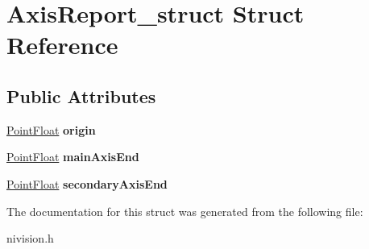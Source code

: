 \hypertarget{structAxisReport__struct}{
\section{AxisReport\_\-struct Struct Reference}
\label{structAxisReport__struct}
}
\subsection*{Public Attributes}
\begin{DoxyCompactItemize}
\item 
\hypertarget{structAxisReport__struct_ae9947337118dc61e3fb3b3bc6200c6c5}{
\hyperlink{structPointFloat__struct}{PointFloat} {\bfseries origin}}
\label{structAxisReport__struct_ae9947337118dc61e3fb3b3bc6200c6c5}

\item 
\hypertarget{structAxisReport__struct_afda8656840b925fa98a78f810e26d554}{
\hyperlink{structPointFloat__struct}{PointFloat} {\bfseries mainAxisEnd}}
\label{structAxisReport__struct_afda8656840b925fa98a78f810e26d554}

\item 
\hypertarget{structAxisReport__struct_a4eee2e398b0d7aed4efc95cadcbcadc5}{
\hyperlink{structPointFloat__struct}{PointFloat} {\bfseries secondaryAxisEnd}}
\label{structAxisReport__struct_a4eee2e398b0d7aed4efc95cadcbcadc5}

\end{DoxyCompactItemize}


The documentation for this struct was generated from the following file:\begin{DoxyCompactItemize}
\item 
nivision.h\end{DoxyCompactItemize}
